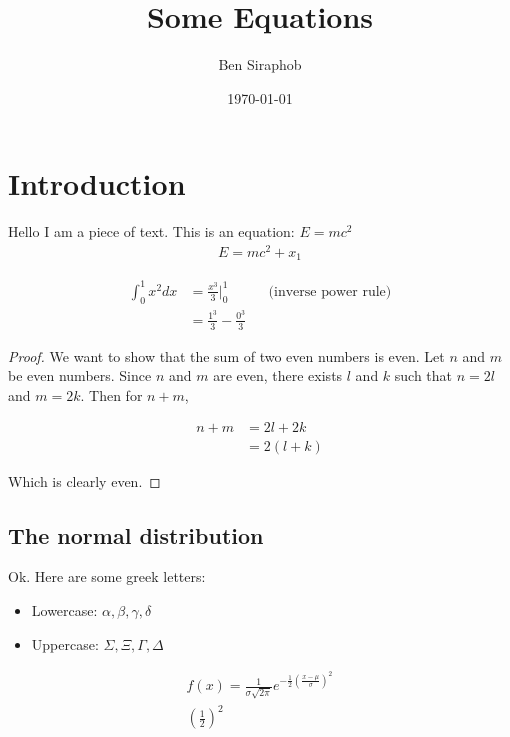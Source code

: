\documentclass{article}
\title{Some Equations}
\author{Ben Siraphob}
\date{\today}
\begin{document}
\maketitle

\section{Introduction}
Hello I am a piece of text. This is an equation: $E=mc^2$
\begin{align*}
  E=mc^2 + x_1
\end{align*}

\begin{align*}
  \int_0^1 x^2 dx &= \frac{x^3}{3}\bigg|_0^1 && \text{(inverse power rule)}\\
  &= \frac{1^3}{3}-\frac{0^3}{3}
\end{align*}

\begin{proof}
  We want to show that the sum of two even numbers is even. Let $n$ and $m$ be even numbers. Since $n$ and $m$ are even, there exists $l$ and $k$ such that $n=2l$ and $m=2k$. Then for $n+m$,
  
  \begin{align*}
      n+m &= 2l+2k \\
      &= 2(l+k)
  \end{align*}
  
  Which is clearly even.
\end{proof}

\subsection*{The normal distribution}
Ok. Here are some greek letters:
\begin{itemize}
    \item Lowercase: $\alpha, \beta,\gamma, \delta$
    \item Uppercase: $\Sigma, \Xi,\Gamma, \Delta$
\end{itemize}


\begin{align*}
    f(x)=\frac{1}{\sigma\sqrt{2\pi}}e^{-\frac{1}{2}(\frac{x-\mu}{\sigma})^2}\\
    \left(\frac{1}{2}\right)^2
\end{align*}
\end{document}
